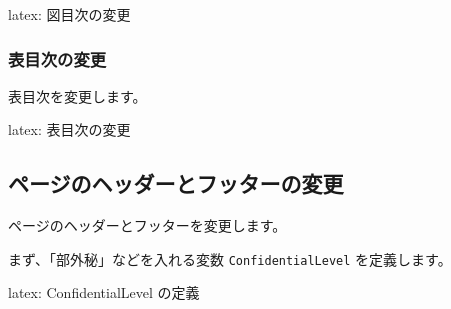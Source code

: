 \documentclass[dvipdfmx,a4j,14pt,uplatex]{jsarticle}
\begin{document}
\begin{programlist}[label={org5e88472}]{latex}{: 図目次の変更}%
\renewcommand{\listoffigures}{%
  \if@twocolumn\@restonecoltrue\onecolumn
  \else\@restonecolfalse\fi
  \section*{\listfigurename %
    \@mkboth{\listfigurename}{\listfigurename}%
      \pdfbookmark{\listfigurename}{listoffigures}}%
  \@starttoc{lof}%
  \if@restonecol\twocolumn\fi
}
\end{programlist}

\subsubsection{表目次の変更}
\label{sec:orgaefbaec}
表目次を変更します。

\begin{programlist}[label={orgf57b8d7}]{latex}{: 表目次の変更}%
\renewcommand{\listoftables}{%
  \if@twocolumn\@restonecoltrue\onecolumn
  \else\@restonecolfalse\fi
  \section*{\listtablename %
  \@mkboth{\listtablename}{\listtablename}%
  \pdfbookmark{\listtablename}{listoftables}}%
  \@starttoc{lot}%
  \if@restonecol\twocolumn\fi
}
\end{programlist}

\subsection{ページのヘッダーとフッターの変更}
\label{sec:org34d54de}
ページのヘッダーとフッターを変更します。

\tcbox[colback=white,colframe=red,size=small,on line]{
  \textcolor{red}{\sffamily \bfseries 部外秘}
  }


まず、「部外秘」などを入れる変数 \texttt{ConfidentialLevel} を定義します。


\begin{programlist}[label={org5cf4084}]{latex}{: ConfidentialLevel の定義}\global\let\@ConfidentialLevel\@empty
\def\ConfidentialLevel#1{\gdef\@ConfidentialLevel{#1}}
\end{programlist}
\end{document}
